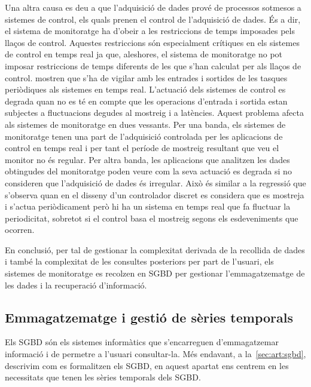 \begin{enumerate}
Una altra causa es deu a que l'adquisició de dades prové de processos
sotmesos a sistemes de control, els quals prenen el control de
l'adquisició de dades. És a dir, el sistema de monitoratge ha d'obeir
a les restriccions de temps imposades pels llaços de control. Aquestes
restriccions són especialment crítiques en els sistemes de control en
temps real ja que, aleshores, el sistema de monitoratge no pot imposar
restriccions de temps diferents de les que s'han calculat per als
llaços de control.  \textcite{lozoya08} mostren que s'ha de vigilar
amb les entrades i sortides de les tasques periòdiques als sistemes en
temps real. L'actuació dels sistemes de control es degrada quan no es
té en compte que les operacions d'entrada i sortida estan subjectes a
fluctuacions degudes al mostreig i a latències. Aquest problema afecta
als sistemes de monitoratge en dues vessants.  Per una banda, els
sistemes de monitoratge tenen una part de l'adquisició controlada per
les aplicacions de control en temps real i per tant el període de
mostreig resultant que veu el monitor no és regular.  
%
Per altra banda,
les aplicacions que analitzen les dades obtingudes del monitoratge
poden veure com la seva actuació es degrada si no consideren que
l'adquisició de dades és irregular. Això és similar a la regressió que
s'observa \parencite{lozoya08} quan en el disseny d'un controlador
discret es considera que es mostreja i s'actua periòdicament però hi
ha un sistema en temps real que fa fluctuar la periodicitat, sobretot
si el control basa el mostreig segons els esdeveniments que ocorren.
\end{enumerate}



En conclusió, per tal de gestionar la complexitat derivada de la
recollida de dades i també la complexitat de les consultes posteriors
per part de l'usuari, els sistemes de monitoratge es recolzen en
\gls{SGBD} per gestionar l'emmagatzematge de les dades i la
recuperació d'informació.






\subsection{Emmagatzematge i gestió de sèries temporals}


Els \gls{SGBD} són els sistemes informàtics que s'encarreguen
d'emmagatzemar informació i de permetre a l'usuari consultar-la. Més
endavant, a la~\autoref{sec:art:sgbd}, descrivim com es formalitzen els
\gls{SGBD}, en aquest apartat ens centrem en les necessitats que tenen
les sèries temporals dels \gls{SGBD}.


